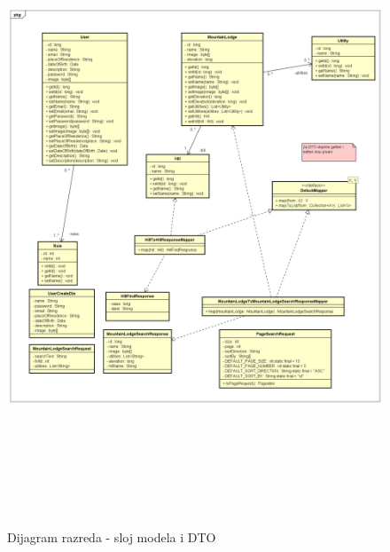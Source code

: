 			\begin{figure}[H]
				\includegraphics[scale=0.6, height=190mm, width=165mm]{dijagrami/model-DTO-sloj.png} %
				\centering
				\caption{Dijagram razreda - sloj modela i DTO}
				\label{fig:dijagrami_razreda2}
			\end{figure}
			\newpage
